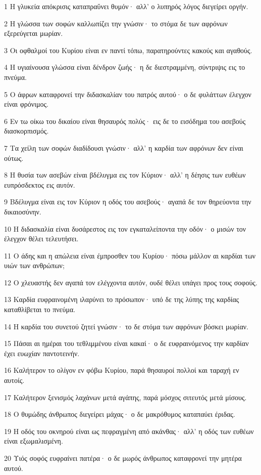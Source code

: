 \par 1 Η γλυκεία απόκρισις καταπραΰνει θυμόν· αλλ' ο λυπηρός λόγος διεγείρει οργήν.
\par 2 Η γλώσσα των σοφών καλλωπίζει την γνώσιν· το στόμα δε των αφρόνων εξερεύγεται μωρίαν.
\par 3 Οι οφθαλμοί του Κυρίου είναι εν παντί τόπω, παρατηρούντες κακούς και αγαθούς.
\par 4 Η υγιαίνουσα γλώσσα είναι δένδρον ζωής· η δε διεστραμμένη, σύντριψις εις το πνεύμα.
\par 5 Ο άφρων καταφρονεί την διδασκαλίαν του πατρός αυτού· ο δε φυλάττων έλεγχον είναι φρόνιμος.
\par 6 Εν τω οίκω του δικαίου είναι θησαυρός πολύς· εις δε το εισόδημα του ασεβούς διασκορπισμός.
\par 7 Τα χείλη των σοφών διαδίδουσι γνώσιν· αλλ' η καρδία των αφρόνων δεν είναι ούτως.
\par 8 Η θυσία των ασεβών είναι βδέλυγμα εις τον Κύριον· αλλ' η δέησις των ευθέων ευπρόσδεκτος εις αυτόν.
\par 9 Βδέλυγμα είναι εις τον Κύριον η οδός του ασεβούς· αγαπά δε τον θηρεύοντα την δικαιοσύνην.
\par 10 Η διδασκαλία είναι δυσάρεστος εις τον εγκαταλείποντα την οδόν· ο μισών τον έλεγχον θέλει τελευτήσει.
\par 11 Ο άδης και η απώλεια είναι έμπροσθεν του Κυρίου· πόσω μάλλον αι καρδίαι των υιών των ανθρώπων;
\par 12 Ο χλευαστής δεν αγαπά τον ελέγχοντα αυτόν, ουδέ θέλει υπάγει προς τους σοφούς.
\par 13 Καρδία ευφραινομένη ιλαρύνει το πρόσωπον· υπό δε της λύπης της καρδίας καταθλίβεται το πνεύμα.
\par 14 Η καρδία του συνετού ζητεί γνώσιν· το δε στόμα των αφρόνων βόσκει μωρίαν.
\par 15 Πάσαι αι ημέραι του τεθλιμμένου είναι κακαί· ο δε ευφραινόμενος την καρδίαν έχει ευωχίαν παντοτεινήν.
\par 16 Καλήτερον το ολίγον εν φόβω Κυρίου, παρά θησαυροί πολλοί και ταραχή εν αυτοίς.
\par 17 Καλήτερον ξενισμός λαχάνων μετά αγάπης, παρά μόσχος σιτευτός μετά μίσους.
\par 18 Ο θυμώδης άνθρωπος διεγείρει μάχας· ο δε μακρόθυμος καταπαύει έριδας.
\par 19 Η οδός του οκνηρού είναι ως πεφραγμένη από ακάνθας· αλλ' η οδός των ευθέων είναι εξωμαλισμένη.
\par 20 Υιός σοφός ευφραίνει πατέρα· ο δε μωρός άνθρωπος καταφρονεί την μητέρα αυτού.
